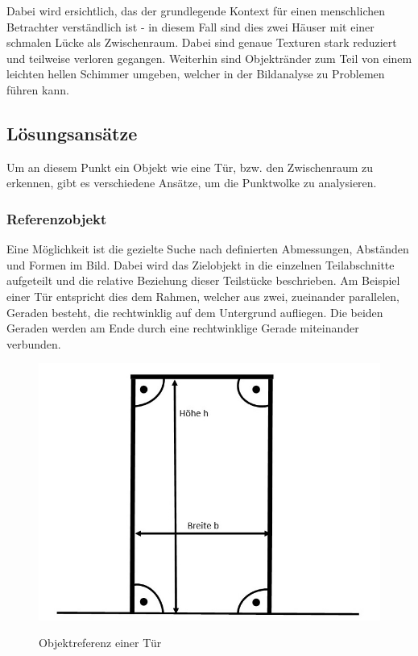 Dabei wird ersichtlich, das der grundlegende Kontext für einen menschlichen Betrachter verständlich ist - in diesem Fall sind dies zwei Häuser mit einer schmalen Lücke als Zwischenraum. Dabei sind genaue Texturen stark reduziert und teilweise verloren gegangen. Weiterhin sind Objektränder zum Teil von einem leichten hellen Schimmer umgeben, welcher in der Bildanalyse zu Problemen führen kann.


\subsection{Lösungsansätze}
Um an diesem Punkt ein Objekt wie eine Tür, bzw. den Zwischenraum zu erkennen, gibt es verschiedene Ansätze, um die Punktwolke zu analysieren.

\subsubsection{Referenzobjekt}
Eine Möglichkeit ist die gezielte Suche nach definierten Abmessungen, Abständen und Formen im Bild. Dabei wird das Zielobjekt in die einzelnen Teilabschnitte aufgeteilt und die relative Beziehung dieser Teilstücke beschrieben. Am Beispiel einer Tür entspricht dies dem Rahmen, welcher aus zwei, zueinander parallelen, Geraden besteht, die rechtwinklig auf dem Untergrund aufliegen. Die beiden Geraden werden am Ende durch eine rechtwinklige Gerade miteinander verbunden. \newline

\begin{figure}[ht]
	\centering
	\includegraphics[scale=0.55]{Bilder/door.jpg}
	\label{fig:door}
	\caption{Objektreferenz einer Tür}
\end{figure}

